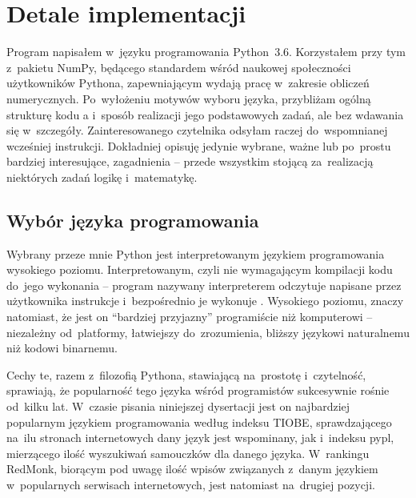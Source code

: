 \section{Detale implementacji}\label{tesliper:implementation}
Program \tesliper{} napisałem w~języku programowania Python~3.6.
Korzystałem przy tym z~pakietu NumPy, będącego standardem wśród naukowej
  społeczności użytkowników Pythona, zapewniającym wydają pracę w~zakresie obliczeń numerycznych.
Po~wyłożeniu motywów wyboru języka, przybliżam ogólną strukturę kodu \tesliper{}a
  i~sposób realizacji jego podstawowych zadań, ale bez wdawania się w~szczegóły.
Zainteresowanego czytelnika odsyłam raczej do~wspomnianej wcześniej instrukcji.
Dokładniej opisuję jedynie wybrane, ważne lub po~prostu bardziej interesujące, zagadnienia
  \--- przede wszystkim stojącą za~realizacją niektórych zadań logikę i~matematykę.

\subsection{Wybór języka programowania}\label{implementation:language}
Wybrany przeze mnie Python jest interpretowanym językiem programowania wysokiego poziomu.
Interpretowanym, czyli nie wymagającym kompilacji kodu do~jego wykonania \--- program nazywany
  interpreterem odczytuje napisane przez użytkownika instrukcje i~bezpośrednio je wykonuje%
  .
Wysokiego poziomu, znaczy natomiast, że jest on \enquote{bardziej przyjazny} programiście
  niż komputerowi \--- niezależny od~platformy, łatwiejszy do~zrozumienia, bliższy językowi
  naturalnemu niż kodowi binarnemu.

Cechy te, razem z~filozofią Pythona, stawiającą na~prostotę i~czytelność, sprawiają,
  że popularność tego języka wśród programistów sukcesywnie rośnie od~kilku lat.
W~czasie pisania niniejszej dysertacji jest on najbardziej popularnym językiem programowania
  według indeksu TIOBE, sprawdzającego na~ilu stronach internetowych dany
  język jest wspominany, jak i~indeksu \gls{pypl}, mierzącego ilość
  wyszukiwań samouczków dla danego języka.
W~rankingu RedMonk, biorącym pod uwagę ilość wpisów związanych z~danym
  językiem w~popularnych serwisach internetowych, jest natomiast na~drugiej pozycji.

